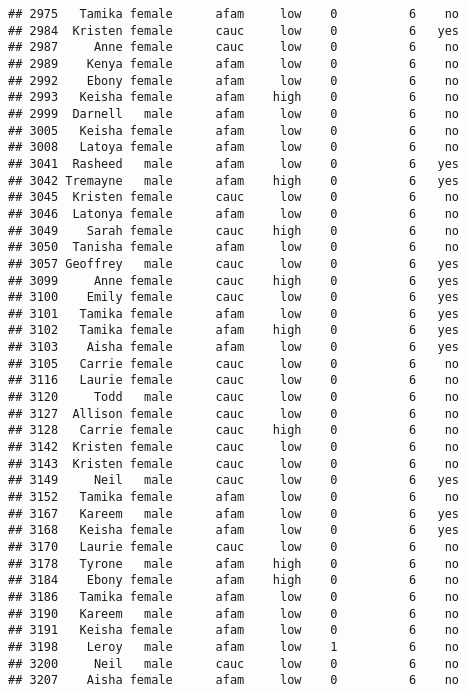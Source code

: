 \documentclass[
]{article}
\begin{document}
\begin{verbatim}
## 2975   Tamika female      afam     low    0          6    no
## 2984  Kristen female      cauc     low    0          6   yes
## 2987     Anne female      cauc     low    0          6    no
## 2989    Kenya female      afam     low    0          6    no
## 2992    Ebony female      afam     low    0          6    no
## 2993   Keisha female      afam    high    0          6    no
## 2999  Darnell   male      afam     low    0          6    no
## 3005   Keisha female      afam     low    0          6    no
## 3008   Latoya female      afam     low    0          6    no
## 3041  Rasheed   male      afam     low    0          6   yes
## 3042 Tremayne   male      afam    high    0          6   yes
## 3045  Kristen female      cauc     low    0          6    no
## 3046  Latonya female      afam     low    0          6    no
## 3049    Sarah female      cauc    high    0          6    no
## 3050  Tanisha female      afam     low    0          6    no
## 3057 Geoffrey   male      cauc     low    0          6   yes
## 3099     Anne female      cauc    high    0          6   yes
## 3100    Emily female      cauc     low    0          6   yes
## 3101   Tamika female      afam     low    0          6   yes
## 3102   Tamika female      afam    high    0          6   yes
## 3103    Aisha female      afam     low    0          6   yes
## 3105   Carrie female      cauc     low    0          6    no
## 3116   Laurie female      cauc     low    0          6    no
## 3120     Todd   male      cauc     low    0          6    no
## 3127  Allison female      cauc     low    0          6    no
## 3128   Carrie female      cauc    high    0          6    no
## 3142  Kristen female      cauc     low    0          6    no
## 3143  Kristen female      cauc     low    0          6    no
## 3149     Neil   male      cauc     low    0          6   yes
## 3152   Tamika female      afam     low    0          6    no
## 3167   Kareem   male      afam     low    0          6   yes
## 3168   Keisha female      afam     low    0          6   yes
## 3170   Laurie female      cauc     low    0          6    no
## 3178   Tyrone   male      afam    high    0          6    no
## 3184    Ebony female      afam    high    0          6    no
## 3186   Tamika female      afam     low    0          6    no
## 3190   Kareem   male      afam     low    0          6    no
## 3191   Keisha female      afam     low    0          6    no
## 3198    Leroy   male      afam     low    1          6    no
## 3200     Neil   male      cauc     low    0          6    no
## 3207    Aisha female      afam     low    0          6    no

\end{verbatim}
\end{document}
